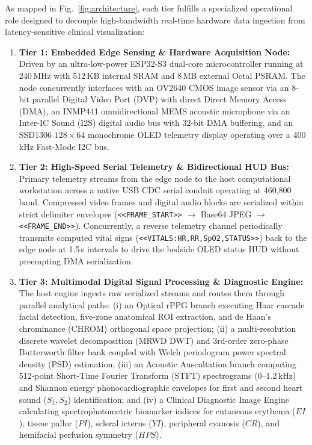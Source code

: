 \documentclass[journal]{IEEEtran}
\begin{document}
As mapped in Fig.~\ref{fig:architecture}, each tier fulfills a specialized operational role designed to decouple high-bandwidth real-time hardware data ingestion from latency-sensitive clinical visualization:
\begin{enumerate}
    \item \textbf{Tier 1: Embedded Edge Sensing \& Hardware Acquisition Node:} Driven by an ultra-low-power ESP32-S3 dual-core microcontroller running at 240\,MHz with 512\,KB internal SRAM and 8\,MB external Octal PSRAM. The node concurrently interfaces with an OV2640 CMOS image sensor via an 8-bit parallel Digital Video Port (DVP) with direct Direct Memory Access (DMA), an INMP441 omnidirectional MEMS acoustic microphone via an Inter-IC Sound (I2S) digital audio bus with 32-bit DMA buffering, and an SSD1306 $128 \times 64$ monochrome OLED telemetry display operating over a 400\,kHz Fast-Mode I2C bus.
    \item \textbf{Tier 2: High-Speed Serial Telemetry \& Bidirectional HUD Bus:} Primary telemetry streams from the edge node to the host computational workstation across a native USB CDC serial conduit operating at 460,800\,baud. Compressed video frames and digital audio blocks are serialized within strict delimiter envelopes (\texttt{<<FRAME\_START>>} $\rightarrow$ Base64 JPEG $\rightarrow$ \texttt{<<FRAME\_END>>}). Concurrently, a reverse telemetry channel periodically transmits computed vital signs (\texttt{<<VITALS:HR,RR,SpO2,STATUS>>}) back to the edge node at 1.5\,s intervals to drive the bedside OLED status HUD without preempting DMA serialization.
    \item \textbf{Tier 3: Multimodal Digital Signal Processing \& Diagnostic Engine:} The host engine ingests raw serialized streams and routes them through parallel analytical paths: (i) an Optical rPPG branch executing Haar cascade facial detection, five-zone anatomical ROI extraction, and de Haan's chrominance (CHROM) orthogonal space projection; (ii) a multi-resolution discrete wavelet decomposition (MRWD DWT) and 3rd-order zero-phase Butterworth filter bank coupled with Welch periodogram power spectral density (PSD) estimation; (iii) an Acoustic Auscultation branch computing 512-point Short-Time Fourier Transform (STFT) spectrograms ($0$--$1.2$\,kHz) and Shannon energy phonocardiographic envelopes for first and second heart sound ($S_1, S_2$) identification; and (iv) a Clinical Diagnostic Image Engine calculating spectrophotometric biomarker indices for cutaneous erythema ($EI$), tissue pallor ($PI$), scleral icterus ($YI$), peripheral cyanosis ($CR$), and hemifacial perfusion symmetry ($HPS$).

\end{enumerate}
\end{document}
